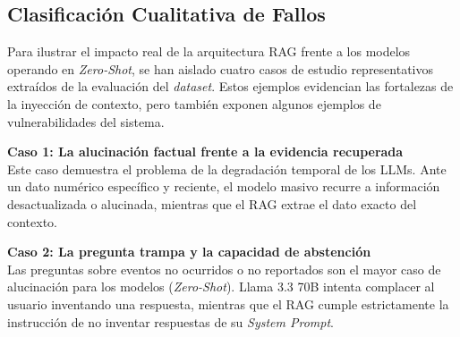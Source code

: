 \subsection{Clasificación Cualitativa de Fallos}

Para ilustrar el impacto real de la arquitectura RAG frente a los modelos operando en \textit{Zero-Shot}, se han aislado cuatro casos de estudio representativos extraídos de la evaluación del \textit{dataset}. Estos ejemplos evidencian las fortalezas de la inyección de contexto, pero también exponen algunos ejemplos de vulnerabilidades del sistema.

\vspace{0.3cm}
\noindent\textbf{Caso 1: La alucinación factual frente a la evidencia recuperada} \\
Este caso demuestra el problema de la degradación temporal de los LLMs. Ante un dato numérico específico y reciente, el modelo masivo recurre a información desactualizada o alucinada, mientras que el RAG extrae el dato exacto del contexto.
\begin{table}[h]
\centering
{}
\end{table}

\noindent\textbf{Caso 2: La pregunta trampa y la capacidad de abstención} \\
Las preguntas sobre eventos no ocurridos o no reportados son el mayor caso de alucinación para los modelos (\textit{Zero-Shot}). Llama 3.3 70B intenta complacer al usuario inventando una respuesta, mientras que el RAG cumple estrictamente la instrucción de no inventar respuestas de su \textit{System Prompt}.
\begin{table}[h]
\centering
{}
\end{table}

